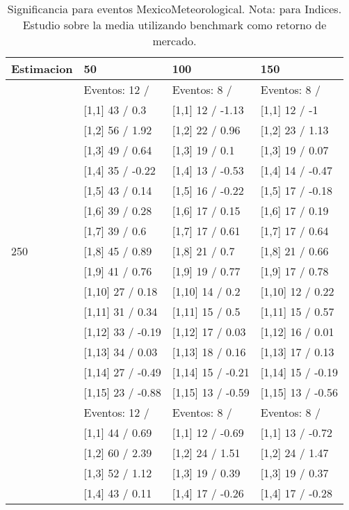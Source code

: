 \begin{table}

\caption{Significancia para eventos MexicoMeteorological. Nota: para Indices. Estudio sobre la media utilizando benchmark como retorno de mercado.}
\centering
\begin{tabular}[t]{llll}
\toprule
Estimacion & 50 & 100 & 150\\
\midrule
 & Eventos:  12 / & Eventos:  8 / & Eventos:  8 /\\
 & {}[1,1] 43  / 0.3 & {}[1,1] 12  / -1.13 & {}[1,1] 12  / -1\\
 & {}[1,2] 56  / 1.92 & {}[1,2] 22  / 0.96 & {}[1,2] 23  / 1.13\\
 & {}[1,3] 49  / 0.64 & {}[1,3] 19  / 0.1 & {}[1,3] 19  / 0.07\\
 & {}[1,4] 35  / -0.22 & {}[1,4] 13  / -0.53 & {}[1,4] 14  / -0.47\\
\addlinespace
 & {}[1,5] 43  / 0.14 & {}[1,5] 16  / -0.22 & {}[1,5] 17  / -0.18\\
 & {}[1,6] 39  / 0.28 & {}[1,6] 17  / 0.15 & {}[1,6] 17  / 0.19\\
 & {}[1,7] 39  / 0.6 & {}[1,7] 17  / 0.61 & {}[1,7] 17  / 0.64\\
250 & {}[1,8] 45  / 0.89 & {}[1,8] 21  / 0.7 & {}[1,8] 21  / 0.66\\
 & {}[1,9] 41  / 0.76 & {}[1,9] 19  / 0.77 & {}[1,9] 17  / 0.78\\
\addlinespace
 & {}[1,10] 27  / 0.18 & {}[1,10] 14  / 0.2 & {}[1,10] 12  / 0.22\\
 & {}[1,11] 31  / 0.34 & {}[1,11] 15  / 0.5 & {}[1,11] 15  / 0.57\\
 & {}[1,12] 33  / -0.19 & {}[1,12] 17  / 0.03 & {}[1,12] 16  / 0.01\\
 & {}[1,13] 34  / 0.03 & {}[1,13] 18  / 0.16 & {}[1,13] 17  / 0.13\\
 & {}[1,14] 27  / -0.49 & {}[1,14] 15  / -0.21 & {}[1,14] 15  / -0.19\\
\addlinespace
 & {}[1,15] 23  / -0.88 & {}[1,15] 13  / -0.59 & {}[1,15] 13  / -0.56\\
 & Eventos:  12 / & Eventos:  8 / & Eventos:  8 /\\
 & {}[1,1] 44  / 0.69 & {}[1,1] 12  / -0.69 & {}[1,1] 13  / -0.72\\
 & {}[1,2] 60  / 2.39 & {}[1,2] 24  / 1.51 & {}[1,2] 24  / 1.47\\
 & {}[1,3] 52  / 1.12 & {}[1,3] 19  / 0.39 & {}[1,3] 19  / 0.37\\
\addlinespace
 & {}[1,4] 43  / 0.11 & {}[1,4] 17  / -0.26 & {}[1,4] 17  / -0.28\\

\end{tabular}
\end{table}
